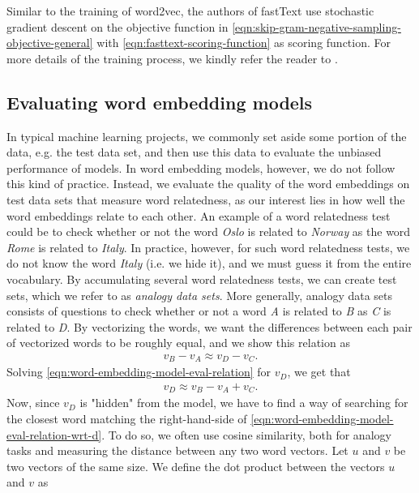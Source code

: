 Similar to the training of word2vec, the authors of fastText use stochastic gradient descent on the objective function in \cref{eqn:skip-gram-negative-sampling-objective-general} with \cref{eqn:fasttext-scoring-function} as scoring function. For more details of the training process, we kindly refer the reader to \cite[p. 3-4]{bojanowski2017enriching}.

\subsection{Evaluating word embedding models}
\label{sec:eval-word-embedding-models}
In typical machine learning projects, we commonly set aside some portion of the data, e.g. the test data set, and then use this data to evaluate the unbiased performance of models. In word embedding models, however, we do not follow this kind of practice. Instead, we evaluate the quality of the word embeddings on test data sets that measure word relatedness, as our interest lies in how well the word embeddings relate to each other. An example of a word relatedness test could be to check whether or not the word \textit{Oslo} is related to \textit{Norway} as the word \textit{Rome} is related to \textit{Italy}. In practice, however, for such word relatedness tests, we do not know the word \textit{Italy} (i.e. we hide it), and we must guess it from the entire vocabulary. By accumulating several word relatedness tests, we can create test sets, which we refer to as \textit{analogy data sets}. More generally, analogy data sets consists of questions to check whether or not a word \textit{A} is related to \textit{B} as \textit{C} is related to \textit{D}. By vectorizing the words, we want the differences between each pair of vectorized words to be roughly equal, and we show this relation as
\begin{align}
    v_{\textit{B}} - v_{\textit{A}} \approx v_{\textit{D}} - v_{\textit{C}}.
    \label{eqn:word-embedding-model-eval-relation}
\end{align}
Solving \cref{eqn:word-embedding-model-eval-relation} for $v_{\textit{D}}$, we get that
\begin{align}
    v_{\textit{D}} \approx v_{\textit{B}} - v_{\textit{A}} + v_{\textit{C}}.
    \label{eqn:word-embedding-model-eval-relation-wrt-d}
\end{align}
Now, since $v_{\textit{D}}$ is "hidden" from the model, we have to find a way of searching for the closest word matching the right-hand-side of \cref{eqn:word-embedding-model-eval-relation-wrt-d}. To do so, we often use cosine similarity, both for analogy tasks and measuring the distance between any two word vectors. Let $u$ and $v$ be two vectors of the same size. We define the dot product between the vectors $u$ and $v$ as
